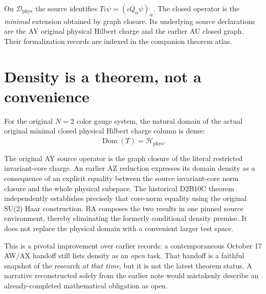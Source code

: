 On $\mathscr D_{\mathrm{phys}}$ the source identifies
$T\iota\psi=(\iota Q_\alpha\psi)_\alpha$.
The closed operator is the \emph{minimal} extension obtained by graph
closure. Its underlying source declarations are the AY original physical
Hilbert charge and the earlier AU closed graph. Their formalization
records are indexed in the companion theorem atlas.

\section{Density is a theorem, not a convenience}
\begin{sourceaccount}\label{thm:T-dense}
For the original $N=2$ color gauge system, the natural domain of the
actual original minimal closed physical Hilbert charge column is dense:
\begin{equation}\label{eq:T-dense}
 \overline{\operatorname{Dom}(T)}
 =\mathscr H_{\mathrm{phys}}.
\end{equation}
\end{sourceaccount}
\begin{sourceexplanation}
The original AY source operator is the graph closure of the literal
restricted invariant-core charge. An earlier AZ reduction expresses its
domain density as a consequence of an explicit equality between the
source invariant-core norm closure and the whole physical subspace.
The historical D2B10C theorem independently establishes precisely that
core-norm equality using the original SU(2) Haar construction. BA
composes the two results in one pinned source environment, thereby
eliminating the formerly conditional density premise. It does not
replace the physical domain with a convenient larger test space.
\end{sourceexplanation}

This is a pivotal improvement over earlier records: a contemporaneous
October 17 AW/AX handoff still lists density as an \emph{open} task.
That handoff is a faithful snapshot of the research \emph{at that time},
but it is not the latest theorem status. A narrative reconstructed solely
from the earlier note would mistakenly describe an already-completed
mathematical obligation as open.

